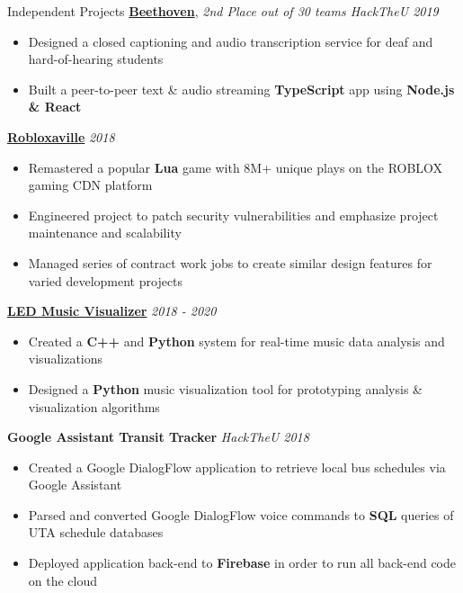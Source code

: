 \documentclass{resume/resume}
\begin{document}
\begin{rSection}{Independent Projects}
    \href{https://devpost.com/software/beethoven-t9ud86}{\bf Beethoven}, {\em 2nd Place out of 30 teams
    \hfill HackTheU 2019}
    \vspace{-6pt}
    \begin{itemize}[nosep]
        \item Designed a closed captioning and audio transcription service for deaf and hard-of-hearing students
        \item Built a peer-to-peer text \& audio streaming {\bf TypeScript} app using {\bf Node.js \& React}
    \end{itemize}

    \href{https://www.roblox.com/games/849680368/Robloxaville-Next-Generation-BETA}{\bf Robloxaville} \hfill {\em 2018}
    \vspace{-6pt}
    \begin{itemize}[nosep]
      \item Remastered a popular {\bf Lua} game with 8M+ unique plays on the ROBLOX gaming CDN platform
      \item Engineered project to patch security vulnerabilities and emphasize project maintenance and scalability
      \item Managed series of contract work jobs to create similar design features for varied development projects
    \end{itemize}
    
    \href{https://www.linkedin.com/feed/update/urn:li:activity:6603722406240628736/}{\bf LED Music Visualizer} \hfill {\em 2018 - 2020}
    \vspace{-6pt}
    \begin{itemize}[nosep]
      \item Created a {\bf C++} and {\bf Python} system for real-time music data analysis and visualizations
      \item Designed a {\bf Python} music visualization tool for prototyping analysis \& visualization algorithms
    \end{itemize}
    
    {\bf Google Assistant Transit Tracker}
    \hfill {\em HackTheU 2018}
    \vspace{-6pt}
    \begin{itemize}[nosep]
      \item Created a Google DialogFlow application to retrieve local bus schedules via Google Assistant
      \item Parsed and converted Google DialogFlow voice commands to {\bf SQL} queries of UTA schedule databases
      \item Deployed application back-end to {\bf Firebase} in order to run all back-end code on the cloud
    \end{itemize}

\end{rSection}
\end{document}
